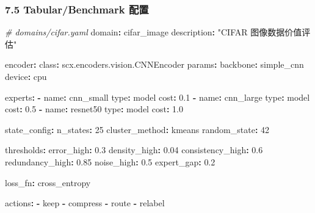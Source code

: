 \documentclass[
  12pt,
]{ctexart}
\newenvironment{Shaded}{}{}
\newcommand{\AttributeTok}[1]{\textcolor[rgb]{0.49,0.56,0.16}{#1}}
\newcommand{\CommentTok}[1]{\textcolor[rgb]{0.38,0.63,0.69}{\textit{#1}}}
\newcommand{\DecValTok}[1]{\textcolor[rgb]{0.25,0.63,0.44}{#1}}
\newcommand{\FloatTok}[1]{\textcolor[rgb]{0.25,0.63,0.44}{#1}}
\newcommand{\FunctionTok}[1]{\textcolor[rgb]{0.02,0.16,0.49}{#1}}
\newcommand{\KeywordTok}[1]{\textcolor[rgb]{0.00,0.44,0.13}{\textbf{#1}}}
\newcommand{\StringTok}[1]{\textcolor[rgb]{0.25,0.44,0.63}{#1}}
\begin{document}
\subsubsection{7.5 Tabular/Benchmark
配置}\label{tabularbenchmark-ux914dux7f6e}

\begin{Shaded}
\begin{Highlighting}[]
\CommentTok{\# domains/cifar.yaml}
\FunctionTok{domain}\KeywordTok{:}\AttributeTok{ cifar\_image}
\FunctionTok{description}\KeywordTok{:}\AttributeTok{ }\StringTok{"CIFAR 图像数据价值评估"}

\FunctionTok{encoder}\KeywordTok{:}
\AttributeTok{  }\FunctionTok{class}\KeywordTok{:}\AttributeTok{ scx.encoders.vision.CNNEncoder}
\AttributeTok{  }\FunctionTok{params}\KeywordTok{:}
\AttributeTok{    }\FunctionTok{backbone}\KeywordTok{:}\AttributeTok{ simple\_cnn}
\AttributeTok{    }\FunctionTok{device}\KeywordTok{:}\AttributeTok{ cpu}

\FunctionTok{experts}\KeywordTok{:}
\AttributeTok{  }\KeywordTok{{-}}\AttributeTok{ }\FunctionTok{name}\KeywordTok{:}\AttributeTok{ cnn\_small}
\AttributeTok{    }\FunctionTok{type}\KeywordTok{:}\AttributeTok{ model}
\AttributeTok{    }\FunctionTok{cost}\KeywordTok{:}\AttributeTok{ }\FloatTok{0.1}
\AttributeTok{  }\KeywordTok{{-}}\AttributeTok{ }\FunctionTok{name}\KeywordTok{:}\AttributeTok{ cnn\_large}
\AttributeTok{    }\FunctionTok{type}\KeywordTok{:}\AttributeTok{ model}
\AttributeTok{    }\FunctionTok{cost}\KeywordTok{:}\AttributeTok{ }\FloatTok{0.5}
\AttributeTok{  }\KeywordTok{{-}}\AttributeTok{ }\FunctionTok{name}\KeywordTok{:}\AttributeTok{ resnet50}
\AttributeTok{    }\FunctionTok{type}\KeywordTok{:}\AttributeTok{ model}
\AttributeTok{    }\FunctionTok{cost}\KeywordTok{:}\AttributeTok{ }\FloatTok{1.0}

\FunctionTok{state\_config}\KeywordTok{:}
\AttributeTok{  }\FunctionTok{n\_states}\KeywordTok{:}\AttributeTok{ }\DecValTok{25}
\AttributeTok{  }\FunctionTok{cluster\_method}\KeywordTok{:}\AttributeTok{ kmeans}
\AttributeTok{  }\FunctionTok{random\_state}\KeywordTok{:}\AttributeTok{ }\DecValTok{42}

\FunctionTok{thresholds}\KeywordTok{:}
\AttributeTok{  }\FunctionTok{error\_high}\KeywordTok{:}\AttributeTok{ }\FloatTok{0.3}
\AttributeTok{  }\FunctionTok{density\_high}\KeywordTok{:}\AttributeTok{ }\FloatTok{0.04}
\AttributeTok{  }\FunctionTok{consistency\_high}\KeywordTok{:}\AttributeTok{ }\FloatTok{0.6}
\AttributeTok{  }\FunctionTok{redundancy\_high}\KeywordTok{:}\AttributeTok{ }\FloatTok{0.85}
\AttributeTok{  }\FunctionTok{noise\_high}\KeywordTok{:}\AttributeTok{ }\FloatTok{0.5}
\AttributeTok{  }\FunctionTok{expert\_gap}\KeywordTok{:}\AttributeTok{ }\FloatTok{0.2}

\FunctionTok{loss\_fn}\KeywordTok{:}\AttributeTok{ cross\_entropy}

\FunctionTok{actions}\KeywordTok{:}
\AttributeTok{  }\KeywordTok{{-}}\AttributeTok{ keep}
\AttributeTok{  }\KeywordTok{{-}}\AttributeTok{ compress}
\AttributeTok{  }\KeywordTok{{-}}\AttributeTok{ route}
\AttributeTok{  }\KeywordTok{{-}}\AttributeTok{ relabel}
\end{Highlighting}
\end{Shaded}
\end{document}
